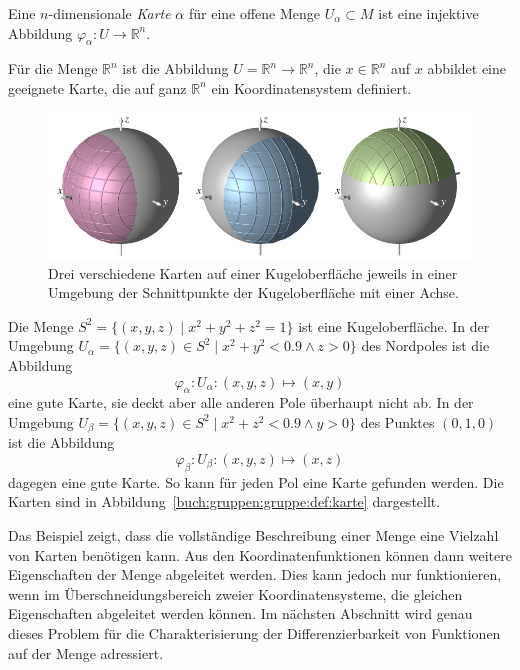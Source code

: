 \begin{definition}
\label{buch:gruppen:gruppe:def:karte}
Eine $n$-dimensionale {\em Karte} $\alpha$ für eine offene Menge
%
$U_\alpha\subset M$ ist eine injektive Abbildung
$\varphi_\alpha\colon U\to \mathbb{R}^n$.
\end{definition}

\begin{beispiel}
Für die Menge $\mathbb{R}^n$ ist die Abbildung
$U=\mathbb{R}^n\to \mathbb{R}^n$, die $x\in\mathbb{R}^n$ auf
$x$ abbildet eine geeignete Karte, die auf ganz $\mathbb{R}^n$ ein
Koordinatensystem definiert.
\end{beispiel}

\begin{beispiel}
\label{buch:gruppen:gruppe:bsp:kugel}
\begin{figure}
\centering
\includegraphics{chapters/030-gruppen/images/kugelkarten.pdf}
\caption{Drei verschiedene Karten auf einer Kugeloberfläche jeweils in
einer Umgebung der Schnittpunkte der Kugeloberfläche mit einer
Achse.
\label{buch:gruppen:gruppe:fig:kugelkarten}}
\end{figure}
Die Menge $S^2 = \{(x,y,z)\mid x^2+y^2+z^2=1\}$ ist eine Kugeloberfläche.
In der Umgebung $U_\alpha = \{(x,y,z)\in S^2\mid x^2+y^2<0.9\wedge z>0\}$
des Nordpoles ist die Abbildung
\[
\varphi_\alpha
\colon
U_\alpha
:
(x,y,z)\mapsto (x,y)
\]
eine gute Karte, sie deckt aber alle anderen Pole überhaupt nicht ab.
In der Umgebung $U_\beta = \{(x,y,z)\in S^2\mid x^2+z^2<0.9\wedge y>0\}$
des Punktes $(0,1,0)$ ist die Abbildung
\[
\varphi_\beta
\colon
U_\beta
:
(x,y,z)\mapsto (x,z)
\]
dagegen eine gute Karte.
So kann für jeden Pol eine Karte gefunden werden.
Die Karten sind in Abbildung~\ref{buch:gruppen:gruppe:def:karte}
dargestellt.
\end{beispiel}

Das Beispiel zeigt, dass die vollständige Beschreibung einer Menge
eine Vielzahl von Karten benötigen kann.
Aus den Koordinatenfunktionen können dann weitere Eigenschaften der
Menge abgeleitet werden.
Dies kann jedoch nur funktionieren, wenn im Überschneidungsbereich
zweier Koordinatensysteme, die gleichen Eigenschaften abgeleitet
werden können.
Im nächsten Abschnitt wird genau dieses Problem für die
Charakterisierung der Differenzierbarkeit von Funktionen auf der
Menge adressiert.

